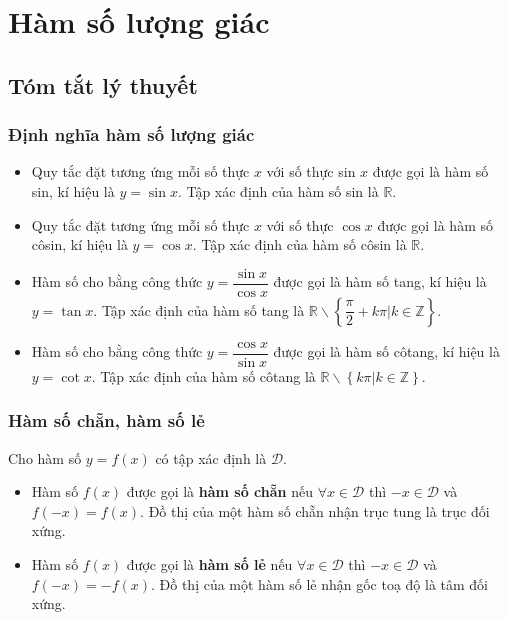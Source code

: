\setcounter{section}{2}
\section{Hàm số lượng giác}
\subsection{Tóm tắt lý thuyết}
\begin{tomtat}
	\subsubsection{Định nghĩa hàm số lượng giác}
	\begin{dn}
		\begin{itemize}
			\item Quy tắc đặt tương ứng mỗi số thực $x$ với số thực sin $x$ được gọi là hàm số sin, kí hiệu là $y=\sin x$.
			Tập xác định của hàm số sin là $\mathbb{R}$.
			\item Quy tắc đặt tương ứng mỗi số thực $x$ với số thực $\cos x$ được gọi là hàm số côsin, kí hiệu là $y=\cos x$.
			Tập xác định của hàm số côsin là $\mathbb{R}$.
			\item Hàm số cho bằng công thức $y=\dfrac{\sin x}{\cos x}$ được gọi là hàm số tang, kí hiệu là $y=\tan x$.
			Tập xác định của hàm số tang là $\mathbb{R} \backslash\left\{\dfrac{\pi}{2}+k \pi \Big| k \in \mathbb{Z} \right\}$.
			\item  Hàm số cho bằng công thức $y=\dfrac{\cos x}{\sin x}$ được gọi là hàm số côtang, kí hiệu là $y=\cot x$.
			Tập xác định của hàm số côtang là $\mathbb{R} \backslash \left \{k \pi \Big| k \in \mathbb{Z} \right \}$.
		\end{itemize}
	\end{dn}
	\subsubsection{Hàm số chẵn, hàm số lẻ}
	\begin{dn}
	Cho hàm số $y=f(x)$ có tập xác định là $\mathscr{D}$.
	\begin{itemize}
		\item Hàm số $f(x)$ được gọi là \textbf{hàm số chẵn} nếu $\forall x \in \mathscr{D}$ thì $-x \in \mathscr{D}$ và $f(-x)=f(x)$. Đồ thị của một hàm số chẵn nhận trục tung là trục đối xứng.
		\item Hàm số $f(x)$ được gọi là \textbf{hàm số lẻ} nếu $\forall x \in \mathscr{D}$ thì $-x \in \mathscr{D}$ và $f(-x)=-f(x)$. Đồ thị của một hàm số lẻ nhận gốc toạ độ là tâm đối xứng.
	\end{itemize}
	\end{dn}

\end{tomtat}

